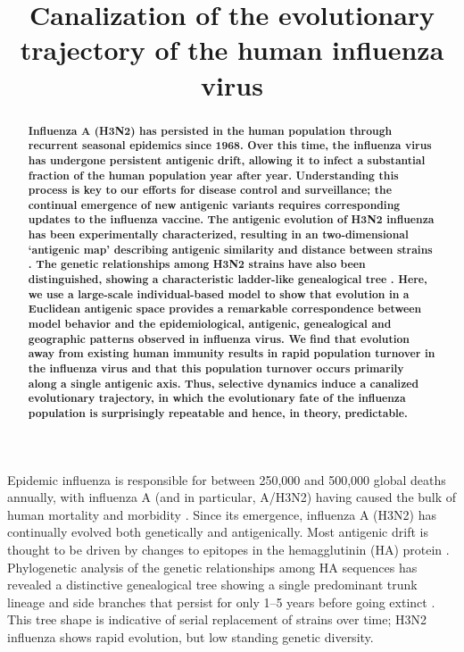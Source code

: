 \renewcommand{\thefigure}{Fig.~\arabic{figure}}
\renewcommand{\thetable}{Table~\arabic{table}}

\title{\Large \bf Canalization of the evolutionary trajectory of the human influenza virus}

\begin{abstract}
\bf \noindent Influenza A (H3N2) has persisted in the human population through recurrent seasonal epidemics since 1968.  Over this time, the influenza virus has undergone persistent antigenic drift, allowing it to infect a substantial fraction of the human population year after year.  Understanding this process is key to our efforts for disease control and surveillance; the continual emergence of new antigenic variants requires corresponding updates to the influenza vaccine.  The antigenic evolution of H3N2 influenza has been experimentally characterized, resulting in an two-dimensional `antigenic map' describing antigenic similarity and distance between strains \cite{Smith04}.  The genetic relationships among H3N2 strains have also been distinguished, showing a characteristic ladder-like genealogical tree \cite{Fitch97}.  Here, we use a large-scale individual-based model to show that evolution in a Euclidean antigenic space provides a remarkable correspondence between model behavior and the epidemiological, antigenic, genealogical and geographic patterns observed in influenza virus.  We find that evolution away from existing human immunity results in rapid population turnover in the influenza virus and that this population turnover occurs primarily along a single antigenic axis.  Thus, selective dynamics induce a canalized evolutionary trajectory, in which the evolutionary fate of the influenza population is surprisingly repeatable and hence, in theory, predictable.
\end{abstract}

\pagebreak

Epidemic influenza is responsible for between 250,000 and 500,000 global deaths annually, with influenza A (and in particular, A/H3N2) having caused the bulk of human mortality and morbidity \cite{flufactsheet}.  Since its emergence, influenza A (H3N2) has continually evolved both genetically and antigenically.  Most antigenic drift is thought to be driven by changes to epitopes in the hemagglutinin (HA) protein \cite{Nelson07NatRevGenet}.  Phylogenetic analysis of the genetic relationships among HA sequences has revealed a distinctive genealogical tree showing a single predominant trunk lineage and side branches that persist for only 1--5 years before going extinct \cite{Fitch97}.  This tree shape is indicative of serial replacement of strains over time; H3N2 influenza shows rapid evolution, but low standing genetic diversity.

